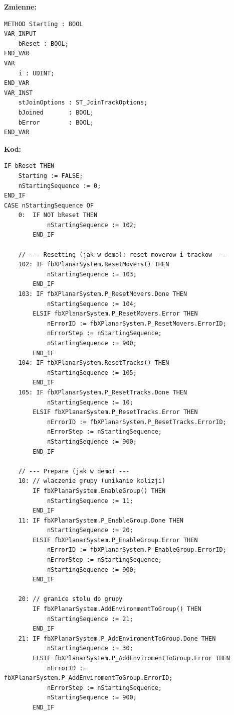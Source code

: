 \documentclass[11pt,a4paper]{report}
\begin{document}
\textbf{Zmienne:}
{\footnotesize
\begin{verbatim}
METHOD Starting : BOOL
VAR_INPUT
    bReset : BOOL;
END_VAR
VAR
    i : UDINT;
END_VAR
VAR_INST
    stJoinOptions : ST_JoinTrackOptions;
    bJoined       : BOOL;
    bError        : BOOL;
END_VAR
\end{verbatim}}
\textbf{Kod:}
{\footnotesize
\begin{verbatim}
IF bReset THEN
    Starting := FALSE;
    nStartingSequence := 0;
END_IF
CASE nStartingSequence OF
    0:  IF NOT bReset THEN
            nStartingSequence := 102;
        END_IF

    // --- Resetting (jak w demo): reset moverow i trackow ---
    102: IF fbXPlanarSystem.ResetMovers() THEN
            nStartingSequence := 103;
        END_IF
    103: IF fbXPlanarSystem.P_ResetMovers.Done THEN
            nStartingSequence := 104;
        ELSIF fbXPlanarSystem.P_ResetMovers.Error THEN
            nErrorID := fbXPlanarSystem.P_ResetMovers.ErrorID;
            nErrorStep := nStartingSequence;
            nStartingSequence := 900;
        END_IF
    104: IF fbXPlanarSystem.ResetTracks() THEN
            nStartingSequence := 105;
        END_IF
    105: IF fbXPlanarSystem.P_ResetTracks.Done THEN
            nStartingSequence := 10;
        ELSIF fbXPlanarSystem.P_ResetTracks.Error THEN
            nErrorID := fbXPlanarSystem.P_ResetTracks.ErrorID;
            nErrorStep := nStartingSequence;
            nStartingSequence := 900;
        END_IF

    // --- Prepare (jak w demo) ---
    10: // wlaczenie grupy (unikanie kolizji)
        IF fbXPlanarSystem.EnableGroup() THEN
            nStartingSequence := 11;
        END_IF
    11: IF fbXPlanarSystem.P_EnableGroup.Done THEN
            nStartingSequence := 20;
        ELSIF fbXPlanarSystem.P_EnableGroup.Error THEN
            nErrorID := fbXPlanarSystem.P_EnableGroup.ErrorID;
            nErrorStep := nStartingSequence;
            nStartingSequence := 900;
        END_IF

    20: // granice stolu do grupy
        IF fbXPlanarSystem.AddEnvironmentToGroup() THEN
            nStartingSequence := 21;
        END_IF
    21: IF fbXPlanarSystem.P_AddEnviromentToGroup.Done THEN
            nStartingSequence := 30;
        ELSIF fbXPlanarSystem.P_AddEnviromentToGroup.Error THEN
            nErrorID := fbXPlanarSystem.P_AddEnviromentToGroup.ErrorID;
            nErrorStep := nStartingSequence;
            nStartingSequence := 900;
        END_IF


\end{verbatim}}
\end{document}
